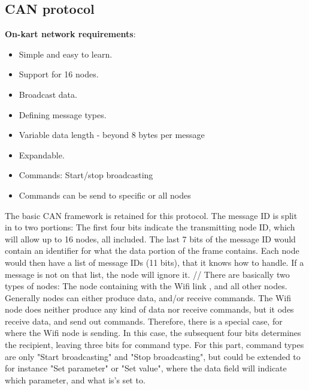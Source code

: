 
\subsection{CAN protocol}\label{sub:CAN_protocol}
\textbf{On-kart network requirements}:
\begin{itemize}
	\item Simple and easy to learn.
	\item Support for 16 nodes.
	\item Broadcast data.
	\item Defining message types.
	\item Variable data length - beyond 8 bytes per message
	\item Expandable.
	\item Commands: Start/stop broadcasting 
	\item Commands can be send to specific or all nodes
\end{itemize}

The basic CAN framework is retained for this protocol. 
The message ID is split in to two portions: The first four bits indicate the transmitting node ID, which will allow up to 16 nodes, all included. 
The last 7 bits of the message ID would contain an identifier for what the data portion of the frame contains.
Each node would then have a list of message IDs (11 bits), that it knows how to handle.
If a message is not on that list, the node will ignore it.
//
There are basically two types of nodes: The node containing with the Wifi link , and all other nodes.
Generally nodes can either produce data, and/or receive commands.
The Wifi node does neither produce any kind of data nor receive commands, but it odes receive data, and send out commands.
Therefore, there is a special case, for where the Wifi node is sending.
In this case, the subsequent four bits determines the recipient, leaving three bits for command type. 
For this part, command types are only "Start broadcasting" and "Stop broadcasting", but could be extended to for instance "Set parameter" or "Set value", where the data field will indicate which parameter, and what is's set to.


